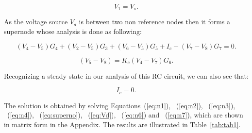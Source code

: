 \begin{equation}
  V_1=V_s.
  \label{eq:n1}
\end{equation}

As the voltage source $V_d$ is between two non reference nodes then it forms a supernode whose analysis is done as following:

\begin{equation}
  (V_4-V_5)G_4+(V_2-V_5)G_3+(V_6-V_5)G_5+I_c+(V_7-V_8)G_7=0.
  \label{eq:superno}
\end{equation}

\begin{equation}
  (V_5-V_8)=K_c(V_4-V_7)G_6.
  \label{eq:Vd}
\end{equation}

Recognizing a steady state in our analysis of this RC circuit, we can also see that:

\begin{equation}
  I_c=0.
  \label{eq:Ic}
\end{equation}

The solution is obtained by solving Equations~(\ref{eq:n1}), ~(\ref{eq:n2}), ~(\ref{eq:n3}), ~(\ref{eq:n4}), ~(\ref{eq:superno}), ~(\ref{eq:Vd}), ~(\ref{eq:n6}) and ~(\ref{eq:n7}), which are shown in matrix form in the Appendix. The results are illustrated in Table~\ref{tab:tab1}.


